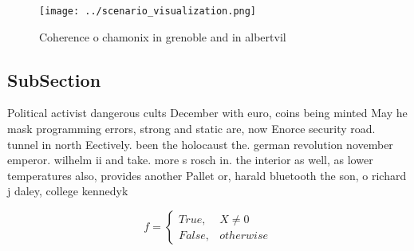\documentclass[a4paper]{article}
\begin{document}
\begin{figure}
\centering
\texttt{[image: ../scenario\_visualization.png]}
\caption{Coherence o chamonix in grenoble and in albertvil
}
\end{figure}
 
\subsection{SubSection}

Political activist dangerous cults December with euro, coins being minted May he mask programming errors, strong and static are, now Enorce security road. tunnel in north Eectively. been the holocaust the. german revolution november emperor. wilhelm ii and take. more s rosch in. the interior as well, as lower temperatures also, provides another Pallet or, harald bluetooth the son, o richard j daley, college kennedyk

\begin{equation}   f =
\begin{cases} True, & X \neq 0\\
False, & otherwise
\end{cases}
\end{equation}
\end{document}
